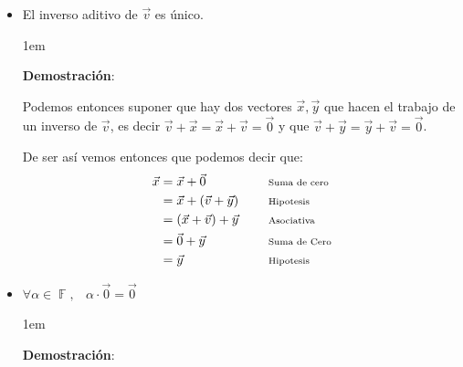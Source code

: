 \documentclass[12pt, fleqn]{report}                             %
\newenvironment{SmallIndentation}[1][0.75em]                    %
        {\begin{adjustwidth}{#1}{}\begin{footnotesize}}             %
        {\end{footnotesize}\end{adjustwidth}}                       %
\DeclareMathOperator \Space {\quad}                             %
\DeclareMathOperator \MiniSpace {\;}                            %
\newcommand \Remember[1]{\Space\text{\scriptsize{#1}}}          %
\theoremstyle{break}                                            %
\DeclareMathOperator \GenericField {\mathbb{F}}                 %
\begin{document}
\begin{itemize}
\begin{SmallIndentation}[1em]
                    \end{SmallIndentation}

                \item El inverso aditivo de $\vec{v}$ es único.

                    \begin{SmallIndentation}[1em]
                        \textbf{Demostración}:

                        Podemos entonces suponer que hay dos vectores $\vec{x}, \vec{y}$ que hacen el 
                        trabajo de un inverso de $\vec{v}$, es decir
                        $\vec{v} + \vec{x} = \vec{x} + \vec{v} = \vec{0}$ y que 
                        $\vec{v} + \vec{y} = \vec{y} + \vec{v} = \vec{0}$.

                        De ser así vemos entonces que podemos decir que:
                        \begin{align*}
                            \vec{x} 
                                &= \vec{x} + \vec{0}                &&\Remember{Suma de cero}   \\
                                &= \vec{x} + (\vec{v} + \vec{y})    &&\Remember{Hipotesis}      \\
                                &= (\vec{x} + \vec{v}) + \vec{y}    &&\Remember{Asociativa}     \\
                                &= \vec{0} + \vec{y}                &&\Remember{Suma de Cero}   \\
                                &= \vec{y}                          &&\Remember{Hipotesis}   
                        \end{align*}

                    \end{SmallIndentation}

                \clearpage


                \item $\forall \alpha \in \GenericField, \MiniSpace \alpha \cdot \vec{0} = \vec{0}$

                    \begin{SmallIndentation}[1em]
                        \textbf{Demostración}:


\end{SmallIndentation}
\end{itemize}
\end{document}
